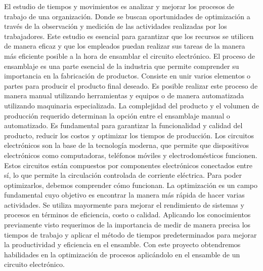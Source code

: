     El estudio de tiempos y movimientos es analizar y mejorar los procesos de trabajo de una organización. Donde se buscan oportunidades de optimización a través de la observación y medición de las actividades realizadas por los trabajadores. Este estudio es esencial para garantizar que los recursos se utilicen de manera eficaz y que los empleados puedan realizar sus tareas de la manera más eficiente posible a la hora de ensamblar el circuito electrónico.
    El proceso de ensamblaje es una parte esencial de la industria que permite comprender su importancia en la fabricación de productos. Consiste en unir varios elementos o partes para producir el producto final deseado.\cite{Ensamble} Es posible realizar este proceso de manera manual utilizando herramientas y equipos o de manera automatizada utilizando maquinaria especializada. La complejidad del producto y el volumen de producción requerido determinan la opción entre el ensamblaje manual o automatizado. Es fundamental para garantizar la funcionalidad y calidad del producto, reducir los costos y optimizar los tiempos de producción.
    Los circuitos electrónicos son la base de la tecnología moderna, que permite que dispositivos electrónicos como computadoras, teléfonos móviles y electrodomésticos funcionen. Estos circuitos están compuestos por componentes electrónicos conectados entre sí, lo que permite la circulación controlada de corriente eléctrica. Para poder optimizarlos, debemos comprender cómo funcionan.
    La optimización es un campo fundamental cuyo objetivo es encontrar la manera más rápida de hacer varias actividades. Se utiliza mayormente para mejorar el rendimiento de sistemas y procesos en términos de eficiencia, costo o calidad.
    Aplicando los conocimientos previamente visto requerimos de la importancia de medir de manera precisa los tiempos de trabajo y aplicar el método de tiempos predeterminados para mejorar la productividad y eficiencia en el ensamble.
    Con este proyecto obtendremos habilidades en la optimización de procesos aplicándolo en el ensamble de un circuito electrónico. 
